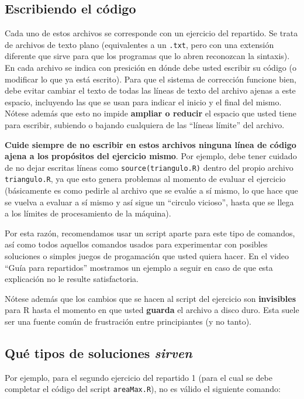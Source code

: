 \documentclass[]{article}
\begin{document}
\subsection{Escribiendo el código}

Cada uno de estos archivos se corresponde con un ejercicio del
repartido. Se trata de archivos de texto plano (equivalentes a un
\texttt{.txt}, pero con una extensión diferente que sirve para que los
programas que lo abren reconozcan la sintaxis). En cada archivo se
indica con presición en dónde debe usted escribir su código (o modificar
lo que ya está escrito). Para que el sistema de corrección funcione
bien, debe evitar cambiar el texto de todas las líneas de texto del
archivo ajenas a este espacio, incluyendo las que se usan para indicar
el inicio y el final del mismo. Nótese además que esto no impide
\textbf{ampliar o reducir} el espacio que usted tiene para escribir,
subiendo o bajando cualquiera de las ``líneas límite'' del archivo.

\textbf{Cuide siempre de no escribir en estos archivos ninguna línea de
código ajena a los propósitos del ejercicio mismo}. Por ejemplo, debe
tener cuidado de no dejar escritas líneas como
\texttt{source(triangulo.R)} dentro del propio archivo
\texttt{triangulo.R}, ya que esto genera problemas al momento de evaluar
el ejercicio (básicamente es como pedirle al archivo que se evalúe a sí
mismo, lo que hace que se vuelva a evaluar a sí mismo y así sigue un
``circulo vicioso'', hasta que se llega a los límites de procesamiento
de la máquina).

Por esta razón, recomendamos usar un script aparte para este tipo de
comandos, así como todos aquellos comandos usados para experimentar con
posibles soluciones o simples juegos de progamación que usted quiera
hacer. En el video ``Guía para repartidos'' mostramos un ejemplo a
seguir en caso de que esta explicación no le resulte satisfactoria.

Nótese además que los cambios que se hacen al script del ejercicio son
\textbf{invisibles} para R hasta el momento en que usted \textbf{guarda}
el archivo a disco duro. Esta suele ser una fuente común de frustración
entre principiantes (y no tanto).

\subsection{Qué tipos de soluciones \emph{sirven}}

Por ejemplo, para el segundo ejercicio del repartido 1 (para el cual se
debe completar el código del script \texttt{areaMax.R}), no es válido el
siguiente comando:
\end{document}
